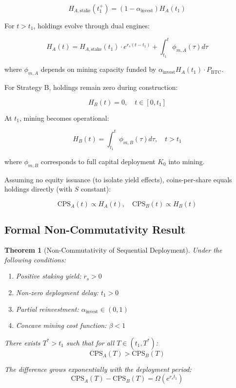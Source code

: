 \documentclass[
  journal=medium,
  manuscript=article-type,
  year=2025,
  volume=1,
]{cup-journal}
\newtheorem{theorem}{Theorem}
\theoremstyle{definition}
\begin{document}
\begin{equation}
H_{A,\text{stake}}(t_1^+) = (1 - \alpha_{\text{invest}}) H_A(t_1)
\end{equation}

For $t > t_1$, holdings evolve through dual engines:

\begin{equation}
H_A(t) = H_{A,\text{stake}}(t_1) \cdot e^{r_s(t - t_1)} + \int_{t_1}^{t} \phi_{m,A}(\tau) d\tau
\end{equation}

where $\phi_{m,A}$ depends on mining capacity funded by $\alpha_{\text{invest}} H_A(t_1) \cdot P_{\text{BTC}}$.

For Strategy B, holdings remain zero during construction:

\begin{equation}
H_B(t) = 0, \quad t \in [0, t_1]
\end{equation}

At $t_1$, mining becomes operational:

\begin{equation}
H_B(t) = \int_{t_1}^{t} \phi_{m,B}(\tau) d\tau, \quad t > t_1
\end{equation}

where $\phi_{m,B}$ corresponds to full capital deployment $K_0$ into mining.

Assuming no equity issuance (to isolate yield effects), coins-per-share equals holdings directly (with $S$ constant):

\begin{equation}
\text{CPS}_A(t) \propto H_A(t), \quad \text{CPS}_B(t) \propto H_B(t)
\end{equation}

\subsection{Formal Non-Commutativity Result}

\begin{theorem}[Non-Commutativity of Sequential Deployment]
Under the following conditions:
\begin{enumerate}[noitemsep]
\item Positive staking yield: $r_s > 0$
\item Non-zero deployment delay: $t_1 > 0$
\item Partial reinvestment: $\alpha_{\text{invest}} \in (0, 1)$
\item Concave mining cost function: $\beta < 1$
\end{enumerate}

There exists $T^* > t_1$ such that for all $T \in (t_1, T^*)$:
\begin{equation}
\text{CPS}_A(T) > \text{CPS}_B(T)
\end{equation}

The difference grows exponentially with the deployment period:
\begin{equation}
\text{CPS}_A(T) - \text{CPS}_B(T) = \Omega\left( e^{r_s t_1} \right)
\end{equation}
\end{theorem}
\end{document}
